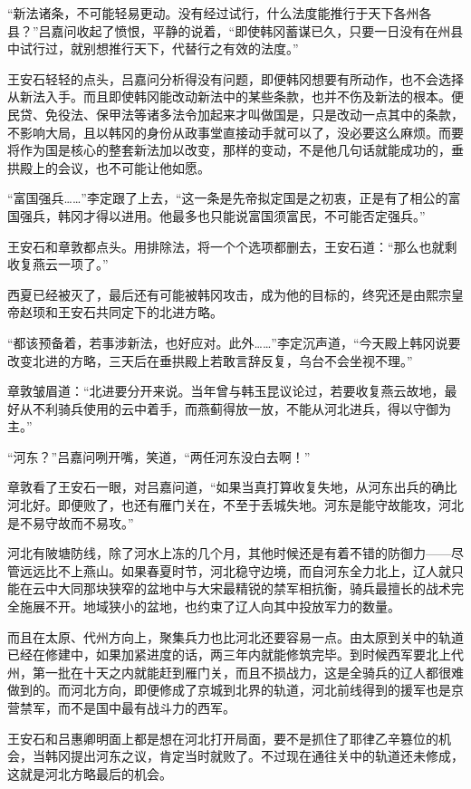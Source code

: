 “新法诸条，不可能轻易更动。没有经过试行，什么法度能推行于天下各州各县？”吕嘉问收起了愤恨，平静的说着，“即使韩冈蓄谋已久，只要一日没有在州县中试行过，就别想推行天下，代替行之有效的法度。”

王安石轻轻的点头，吕嘉问分析得没有问题，即便韩冈想要有所动作，也不会选择从新法入手。而且即使韩冈能改动新法中的某些条款，也并不伤及新法的根本。便民贷、免役法、保甲法等诸多法令加起来才叫做国是，只是改动一点其中的条款，不影响大局，且以韩冈的身份从政事堂直接动手就可以了，没必要这么麻烦。而要将作为国是核心的整套新法加以改变，那样的变动，不是他几句话就能成功的，垂拱殿上的会议，也不可能让他如愿。

“富国强兵……”李定跟了上去，“这一条是先帝拟定国是之初衷，正是有了相公的富国强兵，韩冈才得以进用。他最多也只能说富国须富民，不可能否定强兵。”

王安石和章敦都点头。用排除法，将一个个选项都删去，王安石道：“那么也就剩收复燕云一项了。”

西夏已经被灭了，最后还有可能被韩冈攻击，成为他的目标的，终究还是由熙宗皇帝赵顼和王安石共同定下的北进方略。

“都该预备着，若事涉新法，也好应对。此外……”李定沉声道，“今天殿上韩冈说要改变北进的方略，三天后在垂拱殿上若敢言辞反复，乌台不会坐视不理。”

章敦皱眉道：“北进要分开来说。当年曾与韩玉昆议论过，若要收复燕云故地，最好从不利骑兵使用的云中着手，而燕蓟得放一放，不能从河北进兵，得以守御为主。”

“河东？”吕嘉问咧开嘴，笑道，“两任河东没白去啊！”

章敦看了王安石一眼，对吕嘉问道，“如果当真打算收复失地，从河东出兵的确比河北好。即便败了，也还有雁门关在，不至于丢城失地。河东是能守故能攻，河北是不易守故而不易攻。”

河北有陂塘防线，除了河水上冻的几个月，其他时候还是有着不错的防御力——尽管远远比不上燕山。如果春夏时节，河北稳守边境，而自河东全力北上，辽人就只能在云中大同那块狭窄的盆地中与大宋最精锐的禁军相抗衡，骑兵最擅长的战术完全施展不开。地域狭小的盆地，也约束了辽人向其中投放军力的数量。

而且在太原、代州方向上，聚集兵力也比河北还要容易一点。由太原到关中的轨道已经在修建中，如果加紧进度的话，两三年内就能修筑完毕。到时候西军要北上代州，第一批在十天之内就能赶到雁门关，而且不损战力，这是全骑兵的辽人都很难做到的。而河北方向，即便修成了京城到北界的轨道，河北前线得到的援军也是京营禁军，而不是国中最有战斗力的西军。

王安石和吕惠卿明面上都是想在河北打开局面，要不是抓住了耶律乙辛篡位的机会，当韩冈提出河东之议，肯定当时就败了。不过现在通往关中的轨道还未修成，这就是河北方略最后的机会。

